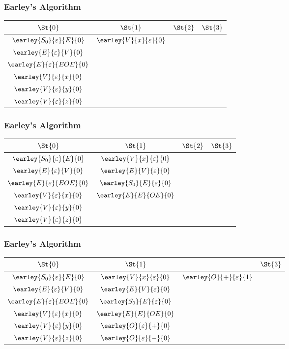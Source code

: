 \begin{frame}
	\frametitle{Earley's Algorithm}
	\centering
	\begin{tabular}{|c|c|c|c|}
		\hline
		$\St{0}$                          & $\St{1}$ & $\St{2}$ & $\St{3}$ \\
		\hline
		$\earley{S_0}{\varepsilon}{E}{0}$ & $\earley{V}{x}{\varepsilon}{0}$ & &\\
		$\earley{E}{\varepsilon}{V}{0}$   & & & \\
		$\earley{E}{\varepsilon}{EOE}{0}$ & & & \\
		$\earley{V}{\varepsilon}{x}{0}$   & & & \\
		$\earley{V}{\varepsilon}{y}{0}$   & & & \\
		$\earley{V}{\varepsilon}{z}{0}$   & & & \\
		\hline
	\end{tabular}
\end{frame}

\begin{frame}
	\frametitle{Earley's Algorithm}
	\centering
	\begin{tabular}{|c|c|c|c|}
		\hline
		$\St{0}$                          & $\St{1}$ & $\St{2}$ & $\St{3}$ \\
		\hline
		$\earley{S_0}{\varepsilon}{E}{0}$ & $\earley{V}{x}{\varepsilon}{0}$   &  & \\
		$\earley{E}{\varepsilon}{V}{0}$   & $\earley{E}{V}{\varepsilon}{0}$   &  & \\
		$\earley{E}{\varepsilon}{EOE}{0}$ & $\earley{S_0}{E}{\varepsilon}{0}$ &  & \\
		$\earley{V}{\varepsilon}{x}{0}$   & $\earley{E}{E}{OE}{0}$            &  & \\
		$\earley{V}{\varepsilon}{y}{0}$   &                                   &  & \\
		$\earley{V}{\varepsilon}{z}{0}$   &                                   &  & \\
		\hline
	\end{tabular}
\end{frame}

\begin{frame}
	\frametitle{Earley's Algorithm}
	\centering
	\begin{tabular}{|c|c|c|c|}
		\hline
		$\St{0}$                          & $\St{1}$                          &\St{2} & $\St{3}$ \\
		\hline
		$\earley{S_0}{\varepsilon}{E}{0}$ & $\earley{V}{x}{\varepsilon}{0}$   & $\earley{O}{+}{\varepsilon}{1}$ & \\
		$\earley{E}{\varepsilon}{V}{0}$   & $\earley{E}{V}{\varepsilon}{0}$   & & \\
		$\earley{E}{\varepsilon}{EOE}{0}$ & $\earley{S_0}{E}{\varepsilon}{0}$ & & \\
		$\earley{V}{\varepsilon}{x}{0}$   & $\earley{E}{E}{OE}{0}$            & & \\
		$\earley{V}{\varepsilon}{y}{0}$   & $\earley{O}{\varepsilon}{+}{0}$   & & \\
		$\earley{V}{\varepsilon}{z}{0}$   & $\earley{O}{\varepsilon}{-}{0}$   & & \\
		\hline
	\end{tabular}
\end{frame}

